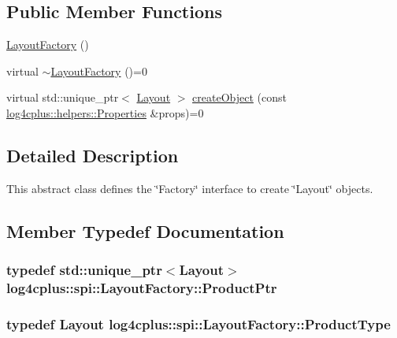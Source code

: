 \subsection*{Public Member Functions}
\begin{DoxyCompactItemize}
\item 
\hyperlink{classlog4cplus_1_1spi_1_1LayoutFactory_a3da4149d3ea50f000953bf81b95236cd}{Layout\-Factory} ()
\item 
virtual \hyperlink{classlog4cplus_1_1spi_1_1LayoutFactory_aa69edd95a8b4a9d971ccf67c35144950}{$\sim$\-Layout\-Factory} ()=0
\item 
virtual std\-::unique\-\_\-ptr$<$ \hyperlink{classlog4cplus_1_1Layout}{Layout} $>$ \hyperlink{classlog4cplus_1_1spi_1_1LayoutFactory_a984416c17630253239e189b912b1e369}{create\-Object} (const \hyperlink{classlog4cplus_1_1helpers_1_1Properties}{log4cplus\-::helpers\-::\-Properties} \&props)=0
\end{DoxyCompactItemize}


\subsection{Detailed Description}
This abstract class defines the \char`\"{}\-Factory\char`\"{} interface to create \char`\"{}\-Layout\char`\"{} objects. 

\subsection{Member Typedef Documentation}
\hypertarget{classlog4cplus_1_1spi_1_1LayoutFactory_a6445a7082eb8f0b5f7795d242d9934a2}{
\subsubsection[{Product\-Ptr}]{\setlength{\rightskip}{0pt plus 5cm}typedef std\-::unique\-\_\-ptr$<${\bf Layout}$>$ {\bf log4cplus\-::spi\-::\-Layout\-Factory\-::\-Product\-Ptr}}}\label{classlog4cplus_1_1spi_1_1LayoutFactory_a6445a7082eb8f0b5f7795d242d9934a2}
\hypertarget{classlog4cplus_1_1spi_1_1LayoutFactory_a316c923d417b59529b25bbbe736d20bf}{
\subsubsection[{Product\-Type}]{\setlength{\rightskip}{0pt plus 5cm}typedef {\bf Layout} {\bf log4cplus\-::spi\-::\-Layout\-Factory\-::\-Product\-Type}}}\label{classlog4cplus_1_1spi_1_1LayoutFactory_a316c923d417b59529b25bbbe736d20bf}



